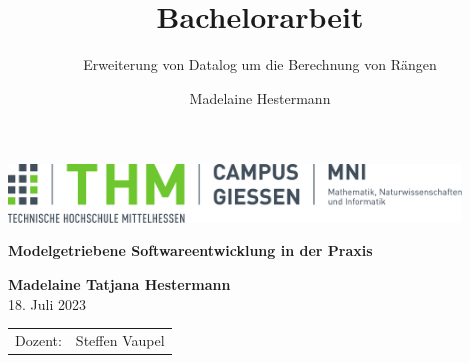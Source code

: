 \documentclass[
a4paper,12pt,listof=toc,bibliography=totoc,twoside, titlepage, headsepline,headings=optiontohead,parskip=half,
BCOR=8.25mm,         %
DIV=12,              %
headsepline=on,      %
]{scrartcl}
\title{Bachelorarbeit}
\subtitle{Erweiterung von Datalog um die Berechnung von Rängen}
\author{Madelaine Hestermann}
\begin{document}
\begin{titlepage}
	\begin{center}
		\includegraphics[width=0.9\textwidth]{img/mni-logo}
		
		\vspace{3cm}	
		
		\huge\textbf{\sffamily Modelgetriebene Softwareentwicklung in der Praxis}
		
		\vspace{1cm}	
		
		
		\normalsize
		\vspace{0.5cm}	
		
		\textbf{Madelaine Tatjana Hestermann}\\ [.5cm] 
		18. Juli 2023
	\end{center}
	\vfill
	\begin{tabular}{ll}
		Dozent: & Steffen Vaupel\\ 
	\end{tabular}
\end{titlepage}
\cleardoubleemptypage







	
	\tableofcontents
\cleardoubleemptypage
	
	\pagestyle{headings}
	\setcounter{page}{1} %
	
	
	
	\clearpage
	
	\setcounter{page}{1}
	
	
		
	
	
\end{document}
